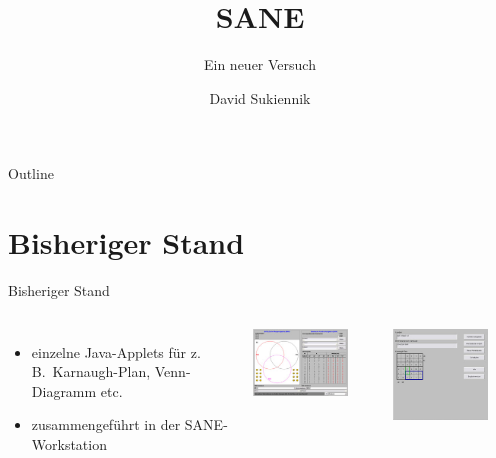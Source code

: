 \documentclass{beamer}
\title{\ac{SANE}}
\subtitle{Ein neuer Versuch}
\author{David Sukiennik}
\institute[FG IKS]{Fachgebiet Integrierte Kommunikationssysteme}
\newcommand{\zB}{z.\,B.\xspace}
\begin{document}
\maketitle

\begin{frame}{Outline}
	\setcounter{tocdepth}{1}
	\tableofcontents
\end{frame}

\section{Bisheriger Stand}
\begin{frame}{Bisheriger Stand}
	\begin{columns}[onlytextwidth]
		\begin{itemize}
			\item einzelne Java-Applets für \zB\ Karnaugh-Plan, Venn-Diagramm etc.
			\item zusammengeführt in der \ac{SANE}-Workstation
		\end{itemize}


		\includegraphics[width=0.8\textwidth]{gfx/bmma_klein.jpg}

		\medskip

		\includegraphics[width=0.8\textwidth]{gfx/karnaugh_klein.jpg}
	\end{columns}
\end{frame}
\end{document}
